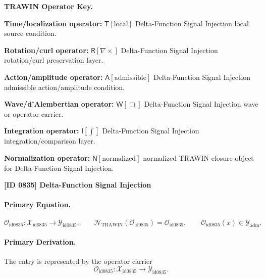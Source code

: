\par\vspace{0.45\baselineskip}
\noindent\begin{minipage}[t]{\linewidth}
\begingroup
\small
\raggedright
\textbf{TRAWIN Operator Key.}\par
\noindent\textbf{Time/localization operator:} $\mathsf{T}\!\left[\mathrm{local}\right]$ Delta-Function Signal Injection local source condition.\par
\noindent\textbf{Rotation/curl operator:} $\mathsf{R}\!\left[\nabla\times\right]$ Delta-Function Signal Injection rotation/curl preservation layer.\par
\noindent\textbf{Action/amplitude operator:} $\mathsf{A}\!\left[\mathrm{admissible}\right]$ Delta-Function Signal Injection admissible action/amplitude condition.\par
\noindent\textbf{Wave/d'Alembertian operator:} $\mathsf{W}\!\left[\Box\right]$ Delta-Function Signal Injection wave or operator carrier.\par
\noindent\textbf{Integration operator:} $\mathsf{I}\!\left[\int\right]$ Delta-Function Signal Injection integration/comparison layer.\par
\noindent\textbf{Normalization operator:} $\mathsf{N}\!\left[\mathrm{normalized}\right]$ normalized TRAWIN closure object for Delta-Function Signal Injection.\par
\endgroup
\end{minipage}

\clearpage
\noindent\textbf{[ID 0835] Delta-Function Signal Injection}\par
\vspace{0.35em}
\paragraph{Primary Equation.}
\[
\mathcal{O}_{\mathrm{id0835}}:\mathcal{X}_{\mathrm{id0835}}\longrightarrow \mathcal{Y}_{\mathrm{id0835}},\qquad
\mathcal{N}_{\mathrm{TRAWIN}}(\mathcal{O}_{\mathrm{id0835}})=\mathcal{O}_{\mathrm{id0835}},\qquad
\mathcal{O}_{\mathrm{id0835}}(x)\in\mathcal{Y}_{\mathrm{adm}}.
\]

\paragraph{Primary Derivation.} The entry is represented by the operator carrier\[
\mathcal{O}_{\mathrm{id0835}}:\mathcal{X}_{\mathrm{id0835}}\longrightarrow \mathcal{Y}_{\mathrm{id0835}}.
\]

